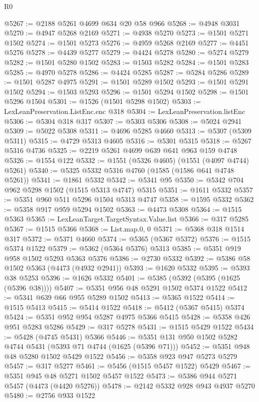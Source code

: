 \begin{lexlean}{R0}
\begin{coremodule}
@5267 := @2188 @5261 @4699 @634 @20 @58 @966
@5268 := @4948 @3031
@5270 := @4947 @5268 @2169
@5271 := @4938 @5270
@5273 := @1501 @5271 @1502
@5274 := @1501 @5273
@5276 := @4959 @5268 @2169
@5277 := @4451 @5276
@5278 := @4439 @5277
@5279 := @4424 @5278
@5280 := @5274 @5279
@5282 := @1501 @5280 @1502
@5283 := @1503 @5282
@5284 := @1501 @5283
@5285 := @4970 @5278
@5286 := @4424 @5285
@5287 := @5284 @5286
@5289 := @1501 @5287 @4975
@5291 := @1501 @5289 @1502
@5293 := @1501 @5291 @1502
@5294 := @1503 @5293
@5296 := @1501 @5294 @1502
@5298 := @1501 @5296 @1504
@5301 := @1526 (@1501 @5298 @1502)
@5303 := LexLeanPreservation.ListEnc.enc @318
@5304 := LexLeanPreservation.listEnc
@5306 := @5304 @318 @317
@5307 := @5303 @5306
@5308 := @5024 @2941
@5309 := @5022 @5308
@5311 := @4696 @5285 @4660
@5313 := @5307 (@5309 @5311)
@5315 := @4729 @5313 @4605
@5316 := @5301 @5315
@5318 := @5267 @5316 @4736
@5325 := @2219 @5261 @4699 @639 @641 @963 @159 @4748
@5326 := @1554 @122
@5332 := @1551 (@5326 @4605) (@1551 (@4097 @4744) @5261)
@5340 := @5325 @5332 @5316 @4760 (@1585 (@1586 @641 @4748 @5261))
@5341 := @1861 @5332
@5342 := @5341 @95
@5350 := @5342 @704 @962 @5298 @1502 (@1515 @5313 @4747) @5315
@5351 := @1611 @5332
@5357 := @5351 @960 @511 @5296 @1504 @5313 @4747
@5358 := @1595 @5332
@5362 := @5358 @917 @959 @5294 @1502
@5363 := @4473 @5308
@5364 := @1515 @5363
@5365 := LexLeanTarget.TargetSyntax.Value.list
@5366 := @317 @5285
@5367 := @1515 @5366
@5368 := List.map.{0, 0}
@5371 := @5368 @318 @1514 @317
@5372 := @5371 @4660
@5374 := @5365 (@5367 @5372)
@5376 := @1515 @5374 @1522
@5379 := @5362 (@5364 @5376) @5313
@5385 := @5351 @919 @958 @1502 @5293 @5363 @5376
@5386 := @2730 @5332
@5392 := @5386 @58 @1502 @5363 (@4473 (@4932 @2941))
@5393 := @1620 @5332
@5395 := @5393 @38 @5253
@5396 := @1626 @5332
@5401 := @5385 (@5392 (@5395 (@1625 (@5396 @38))))
@5407 := @5351 @956 @48 @5291 @1502 @5374 @1522
@5412 := @5341 @639 @66 @955 @5289 @1502
@5413 := @5365 @1522
@5414 := @1515 @5413
@5415 := @5414 @1522
@5418 := @5412 (@5367 @5415) @5374
@5424 := @5351 @952 @954 @5287 @4975 @5366 @5415
@5428 := @5358 @426 @951 @5283 @5286
@5429 := @317 @5278
@5431 := @1515 @5429 @1522
@5434 := @5428 (@4745 @5431) @5366
@5446 := @5351 @131 @950 @1502 @5282 @4744 @5431 (@5393 @71 @4744 (@1625 (@5396 @71)))
@5452 := @5351 @948 @48 @5280 @1502 @5429 @1522
@5456 := @5358 @923 @947 @5273 @5279
@5457 := @317 @5277
@5461 := @5456 (@1515 @5457 @1522) @5429
@5467 := @5351 @945 @48 @5271 @1502 @5457 @1522
@5473 := @5386 @944 @5271 @5457 (@4473 (@4420 @5276))
@5478 := @2142 @5332 @928 @943 @4937 @5270
@5480 := @2756 @933 @1522

\end{coremodule}
\end{lexlean}
